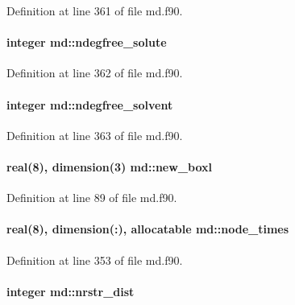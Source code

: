 Definition at line 361 of file md.\-f90.

\hypertarget{classmd_a9a8263a6798b12ca72bceda5eed32a62}{
\paragraph[{ndegfree\-\_\-solute}]{\setlength{\rightskip}{0pt plus 5cm}integer md\-::ndegfree\-\_\-solute}}\label{classmd_a9a8263a6798b12ca72bceda5eed32a62}


Definition at line 362 of file md.\-f90.

\hypertarget{classmd_a9f74d744b2b24cd60118f12e92fc977b}{
\paragraph[{ndegfree\-\_\-solvent}]{\setlength{\rightskip}{0pt plus 5cm}integer md\-::ndegfree\-\_\-solvent}}\label{classmd_a9f74d744b2b24cd60118f12e92fc977b}


Definition at line 363 of file md.\-f90.

\hypertarget{classmd_a47591eaaa5473ebecfd55e728e00e441}{
\paragraph[{new\-\_\-boxl}]{\setlength{\rightskip}{0pt plus 5cm}real(8), dimension(3) md\-::new\-\_\-boxl}}\label{classmd_a47591eaaa5473ebecfd55e728e00e441}


Definition at line 89 of file md.\-f90.

\hypertarget{classmd_ac88ca55416eb2c99aea2af2d81774c93}{
\paragraph[{node\-\_\-times}]{\setlength{\rightskip}{0pt plus 5cm}real(8), dimension(\-:), allocatable md\-::node\-\_\-times}}\label{classmd_ac88ca55416eb2c99aea2af2d81774c93}


Definition at line 353 of file md.\-f90.

\hypertarget{classmd_ac29f71fd4163d5e12b706cdf31f27761}{
\paragraph[{nrstr\-\_\-dist}]{\setlength{\rightskip}{0pt plus 5cm}integer md\-::nrstr\-\_\-dist}}\label{classmd_ac29f71fd4163d5e12b706cdf31f27761}


